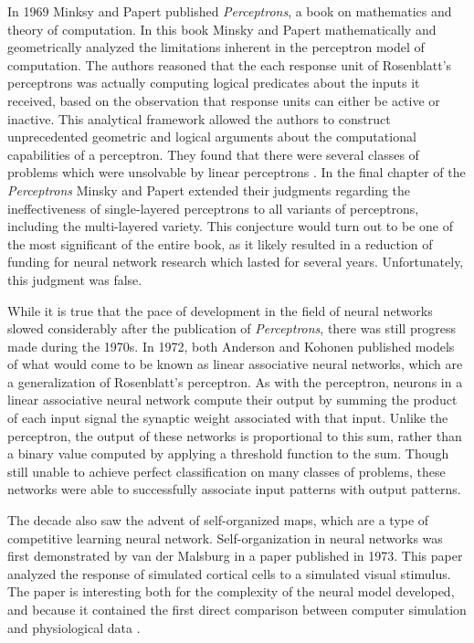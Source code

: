 \documentclass[11pt]{afthesis}
\begin{document}
	In 1969 Minksy and Papert published \textit{Perceptrons}, a book on mathematics and theory of computation. In this book Minsky and Papert mathematically and geometrically analyzed the limitations inherent in the perceptron model of computation. The authors reasoned that the each response unit of Rosenblatt's perceptrons was actually computing logical predicates about the inputs it received, based on the observation that response units can either be active or inactive. This analytical framework allowed the authors to construct unprecedented geometric and logical arguments about the computational capabilities of a perceptron. They found that there were several classes of problems which were unsolvable by linear perceptrons \cite{minsky1969perceptrons}. In the final chapter of the \textit{Perceptrons} Minsky and Papert extended their judgments regarding the ineffectiveness of single-layered perceptrons to all variants of perceptrons, including the multi-layered variety. This conjecture would turn out to be one of the most significant of the entire book, as it likely resulted in a reduction of funding for neural network research \cite{anderson1988neurocomputing} which lasted for several years. Unfortunately, this judgment was false.
	
	While it is true that the pace of development in the field of neural networks slowed considerably after the publication of \textit{Perceptrons}, there was still progress made during the 1970s. In 1972, both Anderson \cite{anderson1972interactive} and Kohonen \cite{kohonen1972correlation} published models of what would come to be known as linear associative neural networks, which are a generalization of Rosenblatt's perceptron. As with the perceptron, neurons in a linear associative neural network compute their output by summing the product of each input signal the synaptic weight associated with that input. Unlike the perceptron, the output of these networks is proportional to this sum, rather than a binary value computed by applying a threshold function to the sum. Though still unable to achieve perfect classification on many classes of problems, these networks were able to successfully associate input patterns with output patterns. 
	
	The decade also saw the advent of self-organized maps, which are a type of competitive learning neural network. Self-organization in neural networks was first demonstrated by van der Malsburg in a paper \cite{vonderMalsburg1973selforganization} published in 1973. This paper analyzed the response of simulated cortical cells to a simulated visual stimulus. The paper is interesting both for the complexity of the neural model developed, and because it contained the first direct comparison between computer simulation and physiological data \cite{anderson1988neurocomputing}. 
	
\end{document}
